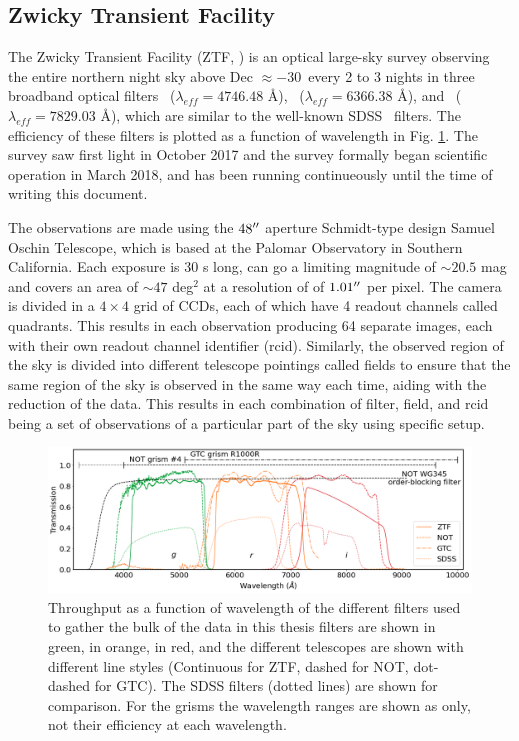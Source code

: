 \documentclass[a4paper,oneside,12pt, class=Latex/Classes/PhDthesisPSnPDF, crop=false]{standalone}
\begin{document}
\subsection{Zwicky Transient Facility}
The Zwicky Transient Facility (ZTF, \citealt{ZTF_Surveys_Scheduler, ZTF_overview_and_1st_results, ZTF_Science_Objectives, ZTF_Instrumentation, ZTF_Observing_System}) is an optical large-sky survey observing the entire northern night sky above Dec $\approx -30$\degree\ every 2 to 3 nights in three broadband optical filters \ztfg~($\lambda_{eff} = 4746.48$ \AA), \ztfr~($\lambda_{eff} = 6366.38$ \AA), and \ztfi~($\lambda_{eff} = 7829.03$ \AA), which are similar to the well-known SDSS \ztfg\ztfr\ztfi\ filters. The efficiency of these filters is plotted as a function of wavelength in Fig. \ref{Optical_elements_plot}. The survey saw first light in October 2017 and the survey formally began scientific operation in March 2018, and has been running continueously until the time of writing this document.

The observations are made using the $48^{\prime\prime}$ aperture Schmidt-type design Samuel Oschin Telescope, which is based at the Palomar Observatory in Southern California. Each exposure is 30 s long, can go a limiting magnitude of $\sim20.5$ mag and covers an area of $\sim47$ deg$^2$ at a resolution of of $1.01^{\prime\prime}$ per pixel. The camera is divided in a $4\times4$ grid of CCDs, each of which have 4 readout channels called quadrants. This results in each observation producing 64 separate images, each with their own readout channel identifier (rcid). Similarly, the observed region of the sky is divided into different telescope pointings called fields to ensure that the same region of the sky is observed in the same way each time, aiding with the reduction of the data. This results in each combination of filter, field, and rcid being a set of observations of a particular part of the sky using specific setup.

\begin{figure}
    \centering
    \includegraphics[width=\textwidth]{../Images/chapter_2/transmissions.png}
    \caption{Throughput as a function of wavelength of the different filters used to gather the bulk of the data in this thesis \ztfg filters are shown in green, \ztfr in orange, \ztfi in red, and the different telescopes are shown with different line styles (Continuous for ZTF, dashed for NOT, dot-dashed for GTC). The SDSS filters (dotted lines) are shown for comparison. For the grisms the wavelength ranges are shown as only, not their efficiency at each wavelength.}
    \label{Optical_elements_plot}
\end{figure}
\end{document}
